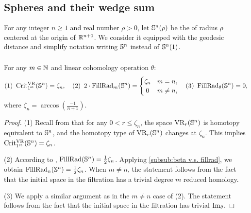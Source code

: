 
\subsection{Spheres and their wedge sum }\label{ss:Sn}\label{sub:Sn and wedge sum}

For any integer $n \geq 1$ and real number $\rho > 0$, let $\mathbb{S}^n(\rho)$ be the  of radius $\rho$ centered at the origin of $\mathbb{R}^{n+1}$.
We consider it equipped with the geodesic distance and simplify notation writing \(\mathbb{S}^n\) instead of \(\mathbb{S}^n(1)\).

\subsubsection{}
\label{subsub:critical values of Sn}
\medskip\proposition
For any $m \in \mathbb{N}$ and linear cohomology operation $\theta$:
\[
\mathrm{(1)}\ \crit(\bS^n) = \zeta_n,
\quad
\mathrm{(2)}\ \, 2\cdot\firstdeath{m}{\bS^n} =
\begin{cases}
	\zeta_n & m = n, \\
	\hfil 0 & m \neq n,
\end{cases}
\quad
\mathrm{(3)}\ \firstdeath{\theta}{\bS^n} = 0,
\]
where \(\zeta_n = \arccos(\tfrac{-1}{n+1})\).

\begin{proof}
	(1) Recall from \cite[Thm.~7.1]{lim2020vietoris} that for any $0 < r \leq \zeta_n$, the space $\mathrm{VR}_r(\mathbb{S}^n)$ is homotopy equivalent to $\mathbb{S}^n$, and the homotopy type of $\mathrm{VR}_r(\mathbb{S}^n)$ changes at $\zeta_n$.
	This implies $\operatorname{Crit^{\mathrm{VR}}_{1^{\mathrm{st}}}}(\mathbb{S}^n)=\zeta_n$.

	(2) According to \cite{katz1983filling}, \(\mathrm{FillRad}(\mathbb{S}^n) = \frac{1}{2}\zeta_n\).
	Applying \cref{subsub:beta v.s. fillrad}, we obtain \(\operatorname{FillRad}_{n}(\mathbb{S}^n) = \frac{1}{2}\zeta_n\).
    When $m\neq n$, the statement follows from the fact that the initial space in the filtration has a trivial degree $m$ reduced homology.

	(3) We apply a similar argument as in the $m\neq n$ case of (2). The statement follows from the fact that the initial space in the filtration has trivial $\operatorname{Im}_\theta$.
\end{proof}


